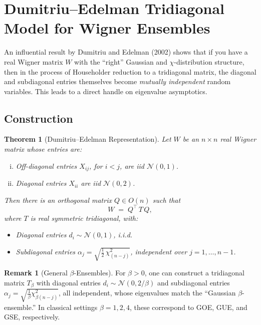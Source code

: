 \documentclass[letterpaper,11pt,oneside,reqno]{article}
\numberwithin{equation}{section}
\newtheorem{theorem}[proposition]{Theorem}
\theoremstyle{definition}
\newtheorem{remark}[proposition]{Remark}
\begin{document}
\section{Dumitriu--Edelman Tridiagonal Model for Wigner Ensembles}
\label{sec:dumitriu-edelman}

An influential result by Dumitriu and Edelman (2002) shows that if you have a real Wigner matrix $W$ with the “right” Gaussian and $\chi$-distribution structure, then in the process of Householder reduction to a tridiagonal matrix, the diagonal and subdiagonal entries themselves become \emph{mutually independent} random variables. This leads to a direct handle on eigenvalue asymptotics.

\subsection{Construction}

\begin{theorem}[Dumitriu--Edelman Representation]
\label{thm:DE-representation}
Let $W$ be an $n \times n$ real Wigner matrix whose entries are:
\begin{enumerate}[(i)]
\item Off-diagonal entries $X_{ij}$, for $i<j$, are iid $\mathcal{N}(0,1)$.
\item Diagonal entries $X_{ii}$ are iid $\mathcal{N}(0,2)$.
\end{enumerate}
Then there is an orthogonal matrix $Q \in O(n)$ such that
\[
  W \;=\; Q^\top \, T\, Q,
\]
where $T$ is real symmetric tridiagonal, with:
\begin{itemize}
\item Diagonal entries $d_i \sim \mathcal{N}(0,1)$, i.i.d.
\item Subdiagonal entries $\displaystyle \alpha_j = \sqrt{\frac12 \,\chi^2_{(n-j)}}$, independent over $j=1,\ldots,n-1$.
\end{itemize}
\end{theorem}

\begin{remark}[General $\beta$-Ensembles]
For $\beta>0$, one can construct a tridiagonal matrix $T_\beta$ with diagonal entries $d_i \sim \mathcal{N}(0,2/\beta)$ and subdiagonal entries $\alpha_j = \sqrt{\frac{1}{\beta}\chi^2_{\beta(n-j)}}$, all independent, whose eigenvalues match the “Gaussian $\beta$-ensemble.” In classical settings $\beta=1,2,4$, these correspond to GOE, GUE, and GSE, respectively.
\end{remark}
\end{document}
